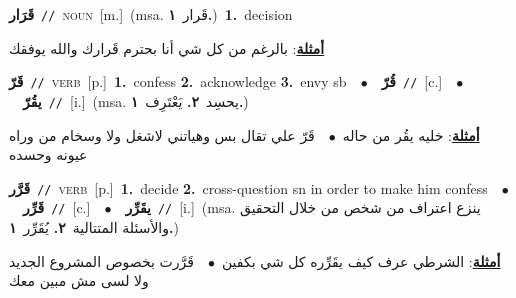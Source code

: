 \documentclass[10pt,a4paper,twoside]{article} %
\begin{document}
\begin{multicols}{2}
{\setlength\topsep{0pt}\textbf{\foreignlanguage{arabic}{قَرَار}}\ {\color{gray}\texttt{//}\color{black}}\ \textsc{noun}\ [m.]\ \color{gray}(msa. \foreignlanguage{arabic}{قَرار}~\foreignlanguage{arabic}{\textbf{١.}})\color{black}\ \textbf{1.}~decision\  \begin{flushright}\color{gray}\foreignlanguage{arabic}{\textbf{\underline{\foreignlanguage{arabic}{أمثلة}}}: بالرغم من كل شي أنا بحترم قَرارك والله يوفقك}\end{flushright}\color{black}} \vspace{2mm}

{\setlength\topsep{0pt}\textbf{\foreignlanguage{arabic}{قَرّ}}\ {\color{gray}\texttt{//}\color{black}}\ \textsc{verb}\ [p.]\ \textbf{1.}~confess  \textbf{2.}~acknowledge  \textbf{3.}~envy sb\ \ $\bullet$\ \ \setlength\topsep{0pt}\textbf{\foreignlanguage{arabic}{قُرّ}}\ {\color{gray}\texttt{//}\color{black}}\ [c.]\ \ $\bullet$\ \ \setlength\topsep{0pt}\textbf{\foreignlanguage{arabic}{يقُرّ}}\ {\color{gray}\texttt{//}\color{black}}\ [i.]\ \color{gray}(msa. \foreignlanguage{arabic}{يحسِد}~\foreignlanguage{arabic}{\textbf{٢.}}  \foreignlanguage{arabic}{يَعْتَرِف}~\foreignlanguage{arabic}{\textbf{١.}})\color{black}\  \begin{flushright}\color{gray}\foreignlanguage{arabic}{\textbf{\underline{\foreignlanguage{arabic}{أمثلة}}}: خليه يقُر من حاله\ $\bullet$\ \  قَرّ علي تقال بس وهياتني لاشغل ولا وسخام من وراه عيونه وحسده}\end{flushright}\color{black}} \vspace{2mm}

{\setlength\topsep{0pt}\textbf{\foreignlanguage{arabic}{قَرَّر}}\ {\color{gray}\texttt{//}\color{black}}\ \textsc{verb}\ [p.]\ \textbf{1.}~decide  \textbf{2.}~cross-question sn in order to make him confess\ \ $\bullet$\ \ \setlength\topsep{0pt}\textbf{\foreignlanguage{arabic}{قَرِّر}}\ {\color{gray}\texttt{//}\color{black}}\ [c.]\ \ $\bullet$\ \ \setlength\topsep{0pt}\textbf{\foreignlanguage{arabic}{يقَرِّر}}\ {\color{gray}\texttt{//}\color{black}}\ [i.]\ \color{gray}(msa. \foreignlanguage{arabic}{ينزع اعتراف من شخص من خلال التحقيق والأسئلة المتتالية}~\foreignlanguage{arabic}{\textbf{٢.}}  \foreignlanguage{arabic}{يُقَرِّر}~\foreignlanguage{arabic}{\textbf{١.}})\color{black}\  \begin{flushright}\color{gray}\foreignlanguage{arabic}{\textbf{\underline{\foreignlanguage{arabic}{أمثلة}}}: الشرطي عرف كيف يقَرِّره كل شي بكفين\ $\bullet$\ \  قَرَّرت بخصوص المشروع الجديد ولا لسى مش مبين معك}\end{flushright}\color{black}} \vspace{2mm}


\end{multicols}
\end{document}
